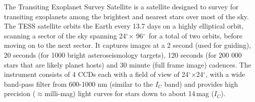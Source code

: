 \documentclass[sn-nature]{sn-jnl}%
\newcommand*\degr{\ensuremath{^\circ}}
\begin{document}




The Transiting Exoplanet Survey Satellite \cite[TESS; ][]{2015JATIS...1a4003R} is a satellite designed to survey for transiting exoplanets among the brightest and nearest stars over most of the sky.
%
The TESS satellite orbits the Earth every 13.7 days on a highly elliptical orbit, scanning a sector of the sky spanning 24\degr $\times$ 96\degr\ for a total of two orbits, before moving on to the next sector. 
%
It captures images at a 2 second (used for guiding), 20 seconds (for 1000 bright asteroseismology targets), 120 seconds (for 200 000 stars that are likely planet hosts) and 30 minute (full frame image) cadences.
%
The instrument consists of 4 CCDs each with a field of view of 24\degr$\times$24\degr, with a wide band-pass filter from 600-1000 nm (similar to the $I_C$ band) and provides high precision ($\approx$milli-mag) light curves for stars down to about 14\,mag ($I_C$).
%



\end{document}
